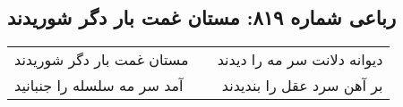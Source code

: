 \begin{center}
\section*{رباعی شماره ۸۱۹: مستان غمت بار دگر شوریدند}
\label{sec:0819}
\begin{longtable}{l p{0.5cm} r}
مستان غمت بار دگر شوریدند
&&
دیوانه دلانت سر مه را دیدند
\\
آمد سر مه سلسله را جنبانید
&&
بر آهن سرد عقل را بندیدند
\\
\end{longtable}
\end{center}
